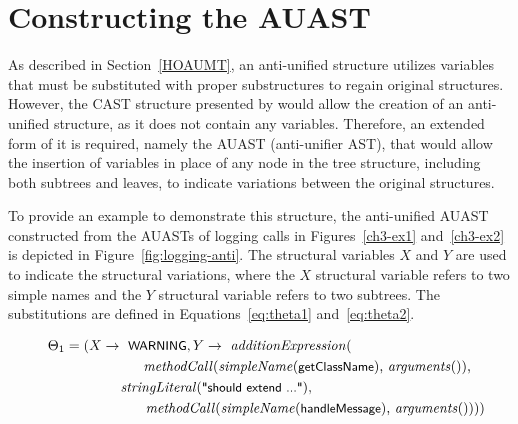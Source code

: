 \section{Constructing the AUAST}  \label{jigsaw-corr}
%
As described in Section~\ref{HOAUMT}, an anti-unified structure utilizes variables that must be substituted with proper substructures to regain original structures. However, the CAST structure presented by \citet{2008:fse:cottrell} would allow the creation of an anti-unified structure, as it does not contain any variables. Therefore, an extended form of it is required, namely the AUAST (anti-unifier AST), that would allow the insertion of variables in place of any node in the tree structure, including both subtrees and leaves, to indicate variations between the original structures.

To provide an example to demonstrate this structure, the anti-unified AUAST constructed from the AUASTs of logging calls in Figures~\ref{ch3-ex1} and~\ref{ch3-ex2} is depicted in Figure~\ref{fig:logging-anti}. The structural variables $X$ and $Y$ are used to indicate the structural variations, where the $X$ structural variable refers to two simple names and the $Y$ structural variable refers to two subtrees. The substitutions are defined in Equations~\ref{eq:theta1} and~\ref{eq:theta2}.


\begin{align}
\Theta_1 = (X \rightarrow \text{ \textsf{\small WARNING}}, Y \rightarrow \text{ \textit{additionExpression}(}\hspace*{3cm}\nonumber\\
\text{\textit{methodCall}(\textit{simpleName}(\textsf{\small getClassName}), \textit{arguments}()),}\nonumber\\
\text{\textit{stringLiteral}(\textsf{\small "should extend ..."}),}\hspace*{4cm}\nonumber\\
\text{\textit{methodCall}(\textit{simpleName}(\textsf{\small handleMessage}), \textit{arguments}()))})\hspace*{-1em}\label{eq:theta1}
\end{align}

